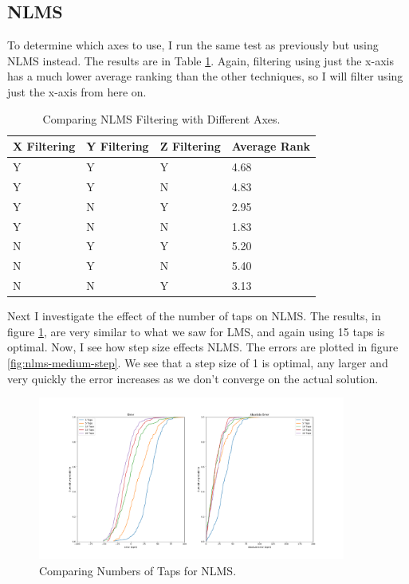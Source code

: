 \documentclass[12pt,a4paper,twoside,openany]{report}
\begin{document}
\subsection{NLMS}

To determine which axes to use, I run the same test as previously but using
NLMS instead. The results are in Table \ref{table:nlms-errors}. Again,
filtering using just the x-axis has a much lower average ranking than the
other techniques, so I will filter using just the x-axis from here on.

\begin{table}[H]
\centering
\caption{Comparing NLMS Filtering with Different Axes.}
\label{table:nlms-errors}
\begin{tabular}{|l|l|l|l|}
\hline
X Filtering & Y Filtering & Z Filtering & Average Rank \\ \hline
Y           & Y           & Y           & 4.68          \\
Y           & Y           & N           & 4.83          \\
Y           & N           & Y           & 2.95          \\
Y           & N           & N           & 1.83          \\
N           & Y           & Y           & 5.20          \\
N           & Y           & N           & 5.40          \\
N           & N           & Y           & 3.13          \\
\hline
\end{tabular}
\end{table}

Next I investigate the effect of the number of taps on NLMS. The results, in
figure \ref{fig:nlms-medium-taps}, are very similar to what we saw for LMS, and
again using 15 taps is optimal.
Now, I see how step size effects NLMS. The errors are plotted in
figure \ref{fig:nlms-medium-step}. We see that a step size of 1 is optimal,
any larger and very quickly the error increases as we don't converge on the
actual solution.

\begin{figure}[H]
	\centerline{\includegraphics[width=0.9\textwidth]{figs/nlms-taps-error-medium-noise.png}}
	\caption{Comparing Numbers of Taps for NLMS.}
	\label{fig:nlms-medium-taps}
\end{figure}
\end{document}
